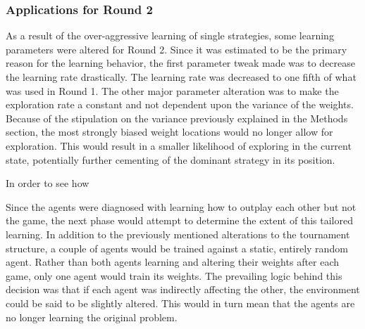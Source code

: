 


\subsubsection{Applications for Round 2}



As a result of the over-aggressive learning of single strategies,
some learning parameters were altered for Round 2.
%
Since it was estimated to be the primary reason for the learning behavior,
the first parameter tweak made was to decrease the learning rate drastically.
%
The learning rate was decreased to one fifth of what was used in Round 1.
%
The other major parameter alteration was to make the exploration rate a constant
and not dependent upon the variance of the weights.
%
Because of the stipulation on the variance previously explained in the Methods
section,
the most strongly biased weight locations would no longer allow for exploration.
%
This would result in a smaller likelihood of exploring in the current state,
potentially further cementing of the dominant strategy in its position.


In order to see how


Since the agents were diagnosed with learning how to outplay each other
but not the game,
the next phase would attempt to determine the extent of this tailored learning.
%
In addition to the previously mentioned alterations to the tournament structure,
a couple of agents would be trained against a static, entirely random agent.
%
Rather than both agents learning and altering their weights after each game,
only one agent would train its weights.
%
The prevailing logic behind this decision was that if each agent was indirectly
affecting the other,
the environment could be said to be slightly altered.
%
This would in turn mean that the agents are no longer learning the original
problem.

